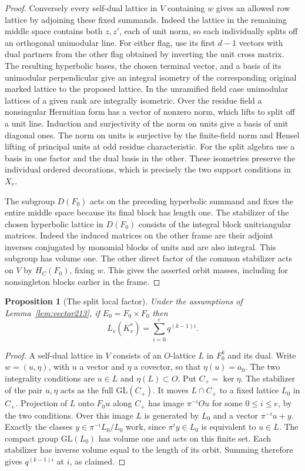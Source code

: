 \documentclass[a4paper,11pt]{article}
\newtheorem{proposition}{Proposition}[section]
\theoremstyle{definition}
\theoremstyle{remark}
\numberwithin{equation}{section}
\begin{document}
\begin{proof}
Conversely every self-dual lattice in \(V\) containing \(w\)
gives an allowed row lattice by adjoining these fixed summands.
Indeed the lattice in the remaining middle space contains both
\(z,z'\), each of unit norm, so each individually splits off
an orthogonal unimodular line. For either flag, use its first
\(d-1\) vectors with dual partners from the other flag obtained
by inverting the unit cross matrix. The resulting hyperbolic
bases, the chosen terminal vector, and a basis of its unimodular
perpendicular give an integral isometry of the corresponding
original marked lattice to the proposed lattice. In the unramified
field case unimodular lattices of a given rank are integrally
isometric. Over the residue field a nonsingular Hermitian form has
a vector of nonzero norm, which lifts to split off a unit line.
Induction and surjectivity of the norm on units give a basis of
unit diagonal ones. The norm on units is surjective by the
finite-field norm and Hensel lifting of principal units at odd
residue characteristic. For the split algebra use a basis in one
factor and the dual basis in the other. These isometries preserve
the individual ordered decorations, which is precisely the two
support conditions in \(X_v\).

The subgroup \(D(F_0)\) acts on the preceding hyperbolic summand
and fixes the entire middle space because its final block has
length one. The stabilizer of the chosen hyperbolic lattice in
\(D(F_0)\) consists of the integral block unitriangular matrices.
Indeed the induced matrices on the other frame are their adjoint inverses
conjugated by monomial blocks of units and are also integral.
This subgroup has volume one. The other direct factor of the
common stabilizer acts on \(V\) by \(H_C(F_0)\), fixing \(w\).
This gives the asserted orbit masses, including for nonsingleton
blocks earlier in the frame.
\end{proof}

\begin{proposition}[The split local factor]\leavevmode\label{prop:split213}
Under the assumptions of Lemma~\ref{lem:vector213}, if
\(E_0=F_0\times F_0\) then
\[
                      L_v(K_v^*)=\sum_{i=0}^{e}q^{(k-1)i}.
\]
\end{proposition}
\begin{proof}
A self-dual lattice in \(V\) consists of an \(O\)-lattice \(L\)
in \(F_0^k\) and its dual. Write \(w=(u,\eta)\), with \(u\)
a vector and \(\eta\) a covector, so that \(\eta(u)=a_0\).
The two integrality conditions are \(u\in L\) and
\(\eta(L)\subset O\). Put \(C_+=\ker\eta\). The stabilizer of
the pair \(u,\eta\) acts as the full \(\mathrm{GL}(C_+)\).
It moves \(L\cap C_+\) to a fixed lattice \(L_0\) in \(C_+\).
Projection of \(L\) onto \(F_0 u\) along \(C_+\) has image
\(\pi^{-i}Ou\) for some \(0\le i\le e\), by the two conditions.
Over this image \(L\) is generated by \(L_0\) and a vector
\(\pi^{-i}u+y\). Exactly the classes
\(y\in\pi^{-i}L_0/L_0\) work, since \(\pi^i y\in L_0\)
is equivalent to \(u\in L\). The compact group \(\mathrm{GL}(L_0)\)
has volume one and acts on this finite set. Each stabilizer has
inverse volume equal to the length of its orbit. Summing therefore
gives \(q^{(k-1)i}\) at \(i\), as claimed.
\end{proof}
\end{document}
